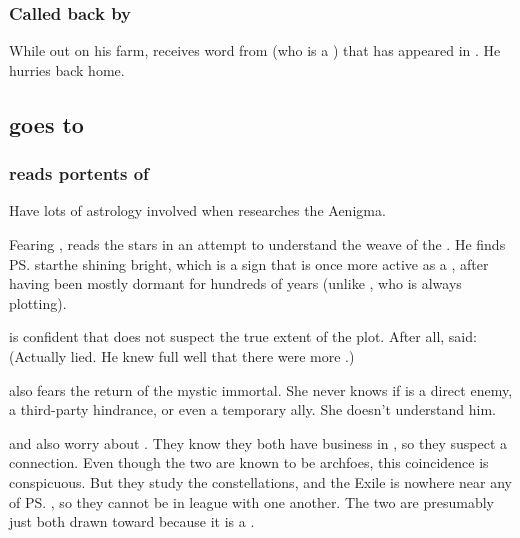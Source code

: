 \subsubsection{Called back by \Achsah}
While out on his farm, \Teshrial{} receives word from \Achsah{} (who is a ) that \Ishnaruchaefir{} has appeared in \Malcur. 
He hurries back home. 









\subsection{\Teshrial goes to \Urizeth}
\subsubsection{\Teshrial{} reads portents of \Ishnaruchaefir}
Have lots of astrology involved when \Teshrial{} researches the Aenigma. 

Fearing \Ishnaruchaefir, \Teshrial{} reads the stars in an attempt to understand the weave of the \matrices. 
He finds \ps{\Ishnaruchaefir} star\dash the \dash shining bright, which is a sign that \Ishnaruchaefir{} is once more active as a \vertex, after having been mostly dormant for hundreds of years (unlike \Secherdamon, who is always plotting). 

\Teshrial{} is confident that \Ishnaruchaefir{} does not suspect the true extent of the \noggyal{} plot. 
After all, \Ishnaruchaefir{} said: 
(Actually \Ishnaruchaefir{} lied. 
 He knew full well that there were more \noggyaleth.)

\Achsah{} also fears the return of the mystic immortal. 
She never knows if \Ishnaruchaefir{} is a direct enemy, a third-party hindrance, or even a temporary ally. 
She doesn't understand him. 

\Achsah{} and \Teshrial{} also worry about \Secherdamon.
They know they both have business in \Malcur, so they suspect a connection. 
Even though the two are known to be archfoes, this coincidence is conspicuous. 
But they study the constellations, and the Exile is nowhere near any of \ps{\Secherdamon} \matrices, so they cannot be in league with one another. 
The two are presumably just both drawn toward \Malcur because it is a \nexus. 





